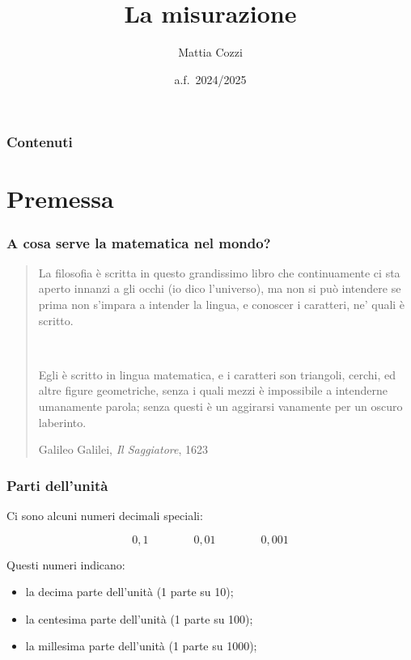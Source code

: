 \documentclass[handout]{beamer}
\title{La misurazione}
\author{Mattia Cozzi}
\date{a.f.~2024/2025}
\theoremstyle{plain}
\begin{document}
\begin{frame}
  \titlepage
\end{frame}





\begin{frame}
\frametitle{Contenuti}
\tableofcontents
\end{frame}


\section{Premessa}




\begin{frame}
\frametitle{A cosa serve la matematica nel mondo?}
\begin{quote}
  La filosofia è scritta in questo grandissimo libro che continuamente ci sta aperto innanzi a gli occhi (io dico l'universo), ma \alert<1>{non si può intendere se prima non s'impara a intender la lingua, e conoscer i caratteri, ne' quali è scritto}.\pause
  
  ~

  \alert<2>{Egli è scritto in lingua matematica}, e i caratteri son triangoli, cerchi, ed altre figure geometriche, senza i quali mezzi è impossibile a intenderne umanamente parola; senza questi è un aggirarsi vanamente per un oscuro laberinto.
  \begin{flushright}
    Galileo Galilei, \emph{Il Saggiatore}, 1623 
  \end{flushright}
\end{quote}
\end{frame}




\begin{frame}
\frametitle{Parti dell'unità}
Ci sono alcuni \alert{numeri decimali speciali}:

\[ 0,1 \qquad \qquad 0,01 \qquad \qquad 0,001 \]\pause

Questi numeri indicano:
\begin{itemize}
  \item la \alert{decima parte} dell'unità (1 parte su 10);\pause
  \item la \alert{centesima parte} dell'unità (1 parte su 100);\pause
  \item la \alert{millesima parte} dell'unità (1 parte su 1000);
\end{itemize}
\end{frame}
\end{document}
